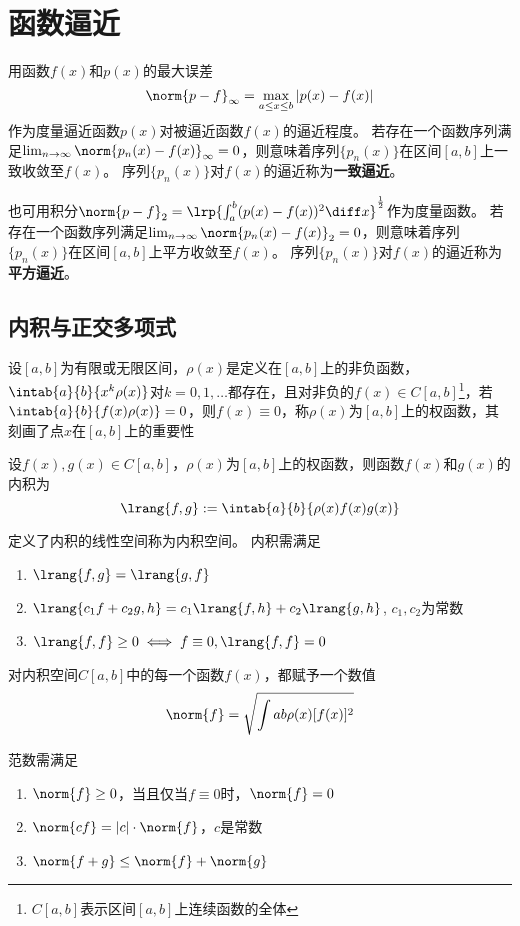 
\section{函数逼近}
用函数$f(x)$和$p(x)$的最大误差
\[\norm{p-f}_\infty=\max_{a\leq x\leq b}|p(x)-f(x)|\]
作为度量逼近函数$p(x)$对被逼近函数$f(x)$的逼近程度。
若存在一个函数序列满足$\lim_{n\to\infty}\norm{p_n(x)-f(x)}_\infty=0$，则意味着序列$\{p_n(x)\}$在区间$[a,b]$上一致收敛至$f(x)$。
序列$\{p_n(x)\}$对$f(x)$的逼近称为\textbf{一致逼近}。

也可用积分$\norm{p-f}_2=\lrp{\int_a^b(p(x)-f(x))^2\diff x}^{\frac{1}{2}}$作为度量函数。
若存在一个函数序列满足$\lim_{n\to\infty}\norm{p_n(x)-f(x)}_2=0$，则意味着序列$\{p_n(x)\}$在区间$[a,b]$上平方收敛至$f(x)$。
序列$\{p_n(x)\}$对$f(x)$的逼近称为\textbf{平方逼近}。

\subsection{内积与正交多项式}
\begin{definition}[权函数]
    设$[a,b]$为有限或无限区间，$\rho(x)$是定义在$[a,b]$上的非负函数，$\intab{a}{b}{x^k\rho(x)}$对$k=0,1,\ldots$都存在，且对非负的$f(x)\in C[a,b]$\footnote{$C[a,b]$表示区间$[a,b]$上连续函数的全体}，若$\intab{a}{b}{f(x)\rho(x)}=0$，则$f(x)\equiv 0$，称$\rho(x)$为$[a,b]$上的权函数，其刻画了点$x$在$[a,b]$上的重要性
\end{definition}
\begin{definition}[内积]
    设$f(x),g(x)\in C[a,b]$，$\rho(x)$为$[a,b]$上的权函数，则函数$f(x)$和$g(x)$的内积为
    \[\lrang{f,g}:=\intab{a}{b}{\rho(x)f(x)g(x)}\]
\end{definition}
定义了内积的线性空间称为内积空间。
内积需满足
\begin{enumerate}
    \item $\lrang{f,g}=\lrang{g,f}$
    \item $\lrang{c_1f+c_2g,h}=c_1\lrang{f,h}+c_2\lrang{g,h}$, $c_1,c_2$为常数
    \item $\lrang{f,f}\geq 0\iff f\equiv 0,\lrang{f,f}=0$
\end{enumerate}

\begin{definition}[范数]
对内积空间$C[a,b]$中的每一个函数$f(x)$，都赋予一个数值
\[\norm{f}=\sqrt{\int{a}{b}{\rho(x)[f(x)]^2}}\]
\end{definition}
范数需满足
\begin{enumerate}
    \item $\norm{f}\geq 0$，当且仅当$f\equiv 0$时，$\norm{f}=0$
    \item $\norm{cf}=|c|\cdot\norm{f}$，$c$是常数
    \item $\norm{f+g}\leq\norm{f}+\norm{g}$
\end{enumerate}


